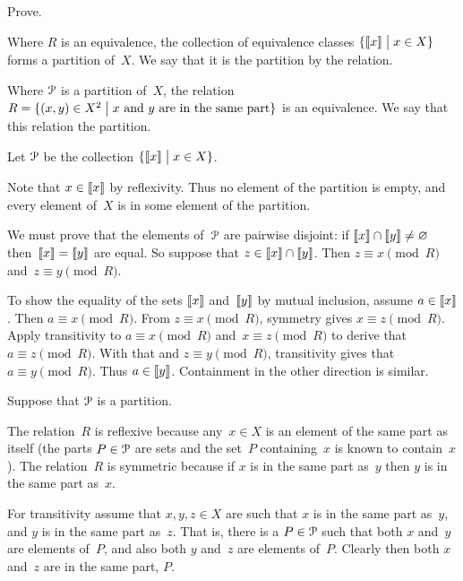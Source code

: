 \documentclass{test}  %
\begin{document}
\begin{ex} \label{ex:EquivClassesFormPartition}
Prove.
\begin{exes}
\item Where $R$ is an equivalence, 
  the collection of equivalence classes 
  $\{\llbracket x \rrbracket \bigm| x\in X\}$ forms a partition of~$X$.
  We say that it is the partition  by the relation.
\item Where $\EuScript{P}$ is a partition of~$X$, 
  the relation 
  $R=\{(x,y)\in X^2 \bigm| \text{$x$ and~$y$ are in the same part}\}$ 
  is an equivalence.
  We say that this relation  the partition. 
\end{exes}
\begin{ans}
\begin{exes}
\item Let $\EuScript{P}$ be the collection $\{\llbracket x \rrbracket \bigm| x\in X\}$.
 
  Note that $x\in\llbracket x \rrbracket$ by reflexivity.
  Thus no element of the partition is empty, and 
  every element of~$X$ is in some element of the partition.

  We must prove that the elements of~$\EuScript{P}$ are pairwise disjoint:
  if $\llbracket x \rrbracket\cap\llbracket y \rrbracket\neq\varnothing$
  then~$\llbracket x \rrbracket=\llbracket y \rrbracket$ are equal.
  So suppose that $z\in\llbracket x \rrbracket\cap\llbracket y \rrbracket$.
  Then $z\equiv x\pmod R$ and~$z\equiv y\pmod R$.

  To show the equality of the sets $\llbracket x \rrbracket$ and~$\llbracket y \rrbracket$ 
  by mutual inclusion, assume $a\in\llbracket x \rrbracket$.
  Then $a\equiv x\pmod R$.
  From $z\equiv x\pmod R$, symmetry gives $x\equiv z\pmod R$.
  Apply transitivity to $a\equiv x\pmod R$ and~$x\equiv z\pmod R$ to
  derive that $a\equiv z\pmod R$.
  With that and $z\equiv y\pmod R$, transitivity gives
  that $a\equiv y\pmod R$. 
  Thus $a\in\llbracket y \rrbracket$.
  Containment in the other direction is similar.  
\item Suppose that $\EuScript{P}$ is a partition. 

  The relation~$R$ is reflexive because any~$x\in X$ is an element of
  the same part as itself
  (the parts $P\in\EuScript{P}$ are sets and the set~$P$ containing~$x$
  is known to contain~$x$).
  The relation~$R$ is symmetric because if $x$ is in the same part as~$y$
  then $y$ is in the same part as~$x$.

  For transitivity assume that $x,y,z\in X$ are such that 
  $x$ is in the same part as~$y$, and 
  $y$ is in the same part as~$z$.
  That is, there is a $P\in\EuScript{P}$ such that
  both $x$ and~$y$ are elements of~$P$, 
  and also both $y$ and~$z$ are elements of~$P$.
  Clearly then both $x$ and~$z$ are in the same part, $P$.
\end{exes}
\end{ans}
\end{ex}
\end{document}
